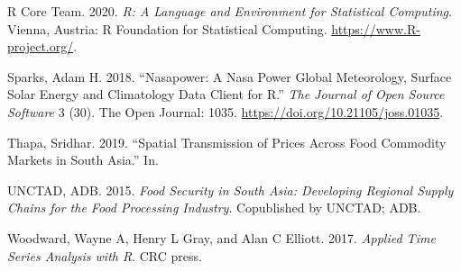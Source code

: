 \documentclass[12pt,]{article}
\begin{document}
\leavevmode\hypertarget{ref-rbase2020}{}%
R Core Team. 2020. \emph{R: A Language and Environment for Statistical Computing}. Vienna, Austria: R Foundation for Statistical Computing. \url{https://www.R-project.org/}.

\leavevmode\hypertarget{ref-nasapowerr2019}{}%
Sparks, Adam H. 2018. ``Nasapower: A Nasa Power Global Meteorology, Surface Solar Energy and Climatology Data Client for R.'' \emph{The Journal of Open Source Software} 3 (30). The Open Journal: 1035. \url{https://doi.org/10.21105/joss.01035}.

\leavevmode\hypertarget{ref-sridharthapaspatial2019}{}%
Thapa, Sridhar. 2019. ``Spatial Transmission of Prices Across Food Commodity Markets in South Asia.'' In.

\leavevmode\hypertarget{ref-unctad2015foodsecurity}{}%
UNCTAD, ADB. 2015. \emph{Food Security in South Asia: Developing Regional Supply Chains for the Food Processing Industry}. Copublished by UNCTAD; ADB.

\leavevmode\hypertarget{ref-woodward2017applied}{}%
Woodward, Wayne A, Henry L Gray, and Alan C Elliott. 2017. \emph{Applied Time Series Analysis with R}. CRC press.
\end{document}
